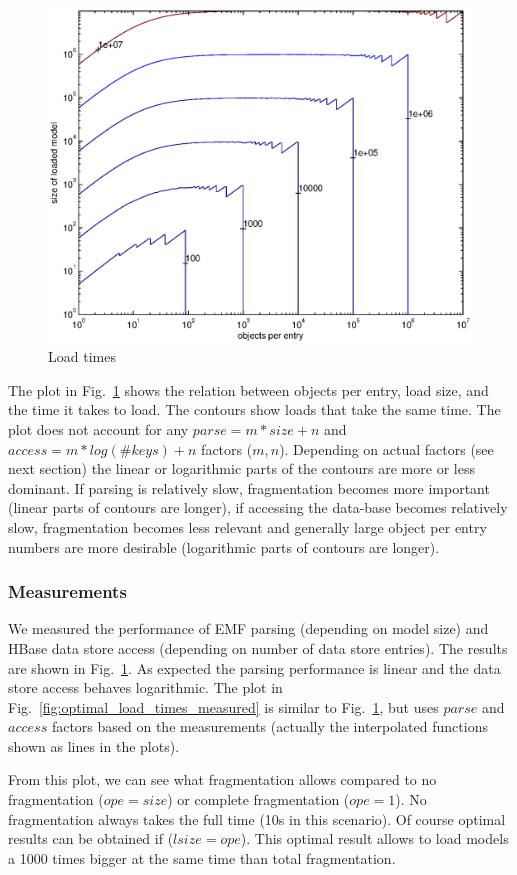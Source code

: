 \begin{figure}
  \centering
  \includegraphics[width=0.65\linewidth]{figures/optimal_load_times}
  \caption{Load times}
  \label{fig:optimal_load_times}
\end{figure}

The plot in Fig.~\ref{fig:optimal_load_times} shows the relation between objects per entry, load size, and the time it takes to load. The contours show loads that take the same time. The plot does not account for any $parse=m*size+n$ and $access=m*log(\#keys)+n$ factors ($m,n$). Depending on actual factors (see next section) the linear or logarithmic parts of the contours are more or less dominant. If parsing is relatively slow, fragmentation becomes more important (linear parts of contours are longer), if accessing the data-base becomes relatively slow, fragmentation becomes less relevant and generally large object per entry numbers are more desirable (logarithmic parts of contours are longer).

\subsubsection{Measurements}

We measured the performance of EMF parsing (depending on model size) and HBase data store access (depending on number of data store entries). The results are shown in Fig.~\ref{fig:optimal_load_times}. As expected the parsing performance is linear and the data store access behaves logarithmic. The plot in Fig.~\ref{fig:optimal_load_times_measured} is similar to Fig.~\ref{fig:optimal_load_times}, but uses $parse$ and $access$ factors based on the measurements (actually the interpolated functions shown as lines in the plots).  

From this plot, we can see what fragmentation allows compared to no fragmentation ($ope=size$) or complete fragmentation ($ope=1$). No fragmentation always takes the full time (10s in this scenario). Of course optimal results can be obtained if ($lsize=ope$). This optimal result allows to load models a 1000 times bigger at the same time than total fragmentation. 

